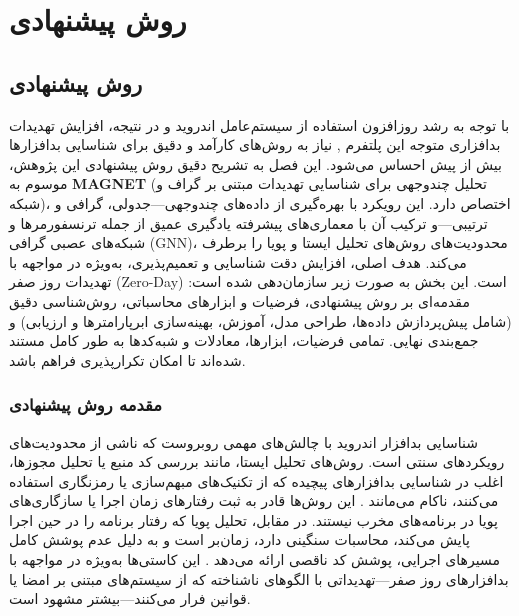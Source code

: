 \usepackage{listings}
\usepackage{xcolor}
\usepackage{bidi} %
\usepackage{hyperref}
\usepackage{caption}
\usepackage{natbib}
\clearpage
\thispagestyle{empty}
\chapter{روش پیشنهادی}\label{chap3}

\section{روش پیشنهادی}

با توجه به رشد روزافزون استفاده از سیستم‌عامل اندروید \citep{Statista2024} و در نتیجه، افزایش تهدیدات بدافزاری متوجه این پلتفرم \citep{Faruki2015, AndroidSecurity}, نیاز به روش‌های کارآمد و دقیق برای شناسایی بدافزارها بیش از پیش احساس می‌شود. این فصل به تشریح دقیق روش پیشنهادی این پژوهش، موسوم به \textbf{MAGNET} (تحلیل چندوجهی برای شناسایی تهدیدات مبتنی بر گراف و شبکه)، اختصاص دارد. این رویکرد با بهره‌گیری از داده‌های چندوجهی—جدولی، گرافی و ترتیبی—و ترکیب آن با معماری‌های پیشرفته یادگیری عمیق از جمله ترنسفورمرها و شبکه‌های عصبی گرافی (GNN)، محدودیت‌های روش‌های تحلیل ایستا و پویا را برطرف می‌کند. هدف اصلی، افزایش دقت شناسایی و تعمیم‌پذیری، به‌ویژه در مواجهه با تهدیدات روز صفر (Zero-Day) است. این بخش به صورت زیر سازمان‌دهی شده است: مقدمه‌ای بر روش پیشنهادی، فرضیات و ابزارهای محاسباتی، روش‌شناسی دقیق (شامل پیش‌پردازش داده‌ها، طراحی مدل، آموزش، بهینه‌سازی ابرپارامترها و ارزیابی) و جمع‌بندی نهایی. تمامی فرضیات، ابزارها، معادلات و شبه‌کدها به طور کامل مستند شده‌اند تا امکان تکرارپذیری فراهم باشد.

\subsection{مقدمه روش پیشنهادی}

شناسایی بدافزار اندروید با چالش‌های مهمی روبروست که ناشی از محدودیت‌های رویکردهای سنتی است. روش‌های تحلیل ایستا، مانند بررسی کد منبع یا تحلیل مجوزها، اغلب در شناسایی بدافزارهای پیچیده که از تکنیک‌های مبهم‌سازی یا رمزنگاری استفاده می‌کنند، ناکام می‌مانند \cite{Drebin}. این روش‌ها قادر به ثبت رفتارهای زمان اجرا یا سازگاری‌های پویا در برنامه‌های مخرب نیستند. در مقابل، تحلیل پویا که رفتار برنامه را در حین اجرا پایش می‌کند، محاسبات سنگینی دارد، زمان‌بر است و به دلیل عدم پوشش کامل مسیرهای اجرایی، پوشش کد ناقصی ارائه می‌دهد \cite{spreitzenbarth2013mobile}. این کاستی‌ها به‌ویژه در مواجهه با بدافزارهای روز صفر—تهدیداتی با الگوهای ناشناخته که از سیستم‌های مبتنی بر امضا یا قوانین فرار می‌کنند—بیشتر مشهود است.

